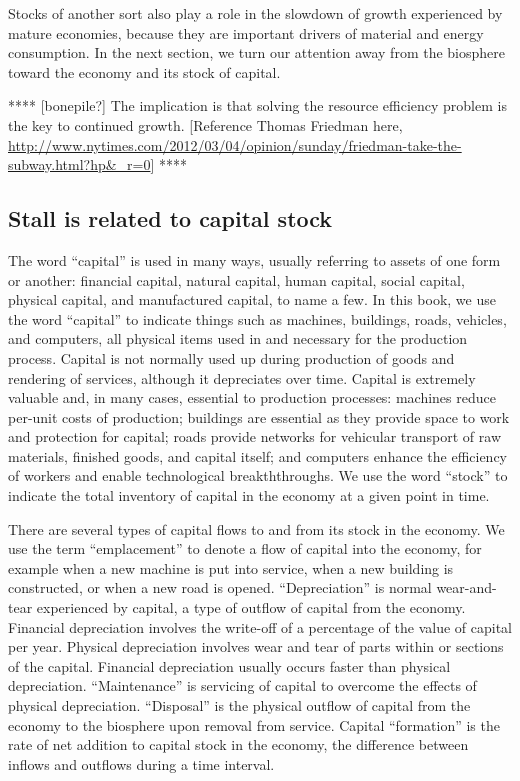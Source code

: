 Stocks of another sort also play a role 
in the slowdown of growth experienced by mature economies,
because they  are important drivers of material and energy consumption.
In the next section, we turn our attention 
away from the biosphere 
toward the economy and its stock of capital.



**** [bonepile?] The implication is that solving the resource efficiency problem
is the key to continued growth. [Reference Thomas Friedman here,
\url{http://www.nytimes.com/2012/03/04/opinion/sunday/friedman-take-the-subway.html?hp&_r=0}]
****


\subsection{Stall is related to capital stock}
\label{sec:stall_capital_stock}

The word ``capital'' is used in many ways, usually referring to assets
of one form or another: 
financial capital, 
natural capital, 
human capital, 
social capital,
physical capital, and
manufactured capital, 
to name a few.
In this book, 
we use the word ``capital'' to indicate things such as
machines, 
buildings, 
roads,
vehicles, and
computers,
all physical items used in and necessary for the production process.
Capital is not normally used up during production 
of goods and rendering of services, 
although it depreciates over time.
Capital is extremely valuable and, in many cases, essential to production processes:
machines reduce per-unit costs of production;
buildings are essential as they provide space to work and protection for capital;
roads provide networks for vehicular transport 
of raw materials, finished goods, and capital itself; and
computers enhance the efficiency of workers and enable technological breakththroughs.
We use the word ``stock'' to indicate the total inventory of capital 
in the economy at a given point in time.

There are several types of capital flows
to and from its stock in the economy.
We use the term ``emplacement'' to denote a flow of capital into
the economy, for example when a new machine is put into service,
when a new building is constructed, or
when a new road is opened.
``Depreciation'' is normal wear-and-tear experienced by capital, 
a type of outflow of capital from the economy.
Financial depreciation involves the write-off of a percentage 
of the value of capital per year.
Physical depreciation involves wear and tear of parts within or sections of the capital.
Financial depreciation usually occurs faster than physical depreciation.
``Maintenance'' is servicing of capital to overcome the effects of physical depreciation.
``Disposal'' is the physical outflow of capital from the economy to the biosphere
upon removal from service.
Capital ``formation'' is the rate of net
addition to capital stock in the economy,
the difference between inflows and outflows
during a time interval.

